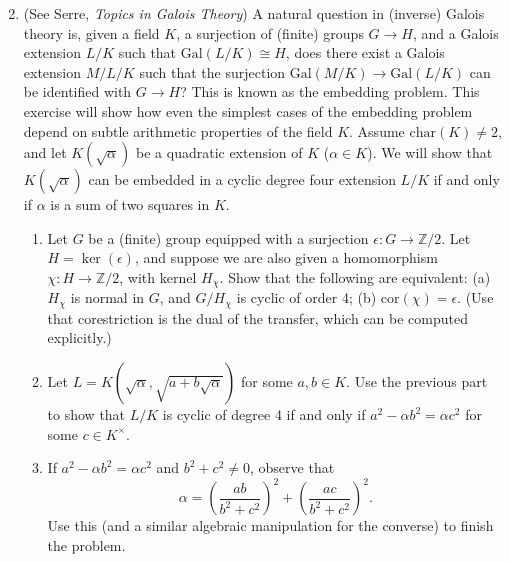 \documentclass[11pt,answers,addpoints,reqno]{exam}
\theoremstyle{definition}
\theoremstyle{remark}
\theoremstyle{definition}
\theoremstyle{remark}
\theoremstyle{remark}
\theoremstyle{remark}
\newcommand{\Z}{\mathbb{Z}}
\newcommand{\Gal}{\mathrm{Gal}} %
\newcommand{\mr}{\mathrm}
\begin{document}
\begin{enumerate}
\begin{enumerate}
\[\]
\end{enumerate}
\item (See Serre, \textit{Topics in Galois Theory}) A natural question in (inverse) Galois theory is, given a field $K$, a surjection of (finite) groups $G \to H$, and a Galois extension $L/K$ such that $\Gal(L/K) \cong H$, does there exist a Galois extension $M/L/K$ such that the surjection $\Gal(M/K) \to \Gal(L/K)$ can be identified with $G \to H$? This is known as the embedding problem. This exercise will show how even the simplest cases of the embedding problem depend on subtle arithmetic properties of the field $K$. Assume $\mr{char}(K) \neq 2$, and let $K(\sqrt{\alpha})$ be a quadratic extension of $K$ ($\alpha \in K$). We will show that $K(\sqrt{\alpha})$ can be embedded in a cyclic degree four extension $L/K$ if and only if $\alpha$ is a sum of two squares in $K$.
\begin{enumerate}
\item Let $G$ be a (finite) group equipped with a surjection $\epsilon \colon G \to \Z/2$. Let $H= \ker(\epsilon)$, and suppose we are also given a homomorphism $\chi \colon H \to \Z/2$, with kernel $H_{\chi}$. Show that the following are equivalent: (a) $H_{\chi}$ is normal in $G$, and $G/H_{\chi}$ is cyclic of order 4; (b) $\mr{cor}(\chi)= \epsilon$. (Use that corestriction is the dual of the transfer, which can be computed explicitly.) 
\item Let $L= K(\sqrt{\alpha}, \sqrt{a+b \sqrt{\alpha}})$ for some $a, b \in K$. Use the previous part to show that $L/K$ is cyclic of degree 4 if and only if $a^2-\alpha b^2= \alpha c^2$ for some $ c\in K^\times$.
\item If $a^2-\alpha b^2= \alpha c^2$ and $b^2+c^2 \neq 0$, observe that 
\[
 \alpha= \left( \frac{ab}{b^2+c^2} \right)^2 + \left( \frac{ac}{b^2+c^2} \right)^2.
\]
Use this (and a similar algebraic manipulation for the converse) to finish the problem.
\end{enumerate}
\end{enumerate}
\end{document}
